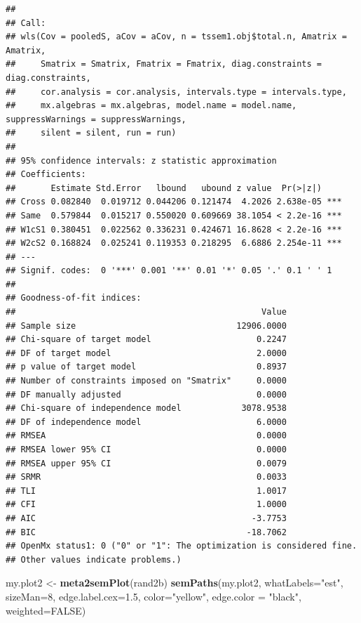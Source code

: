 \documentclass[]{article}
\newenvironment{Shaded}{\begin{snugshade}}{\end{snugshade}}
\newcommand{\KeywordTok}[1]{\textcolor[rgb]{0.13,0.29,0.53}{\textbf{#1}}}
\newcommand{\DataTypeTok}[1]{\textcolor[rgb]{0.13,0.29,0.53}{#1}}
\newcommand{\DecValTok}[1]{\textcolor[rgb]{0.00,0.00,0.81}{#1}}
\newcommand{\FloatTok}[1]{\textcolor[rgb]{0.00,0.00,0.81}{#1}}
\newcommand{\StringTok}[1]{\textcolor[rgb]{0.31,0.60,0.02}{#1}}
\newcommand{\OtherTok}[1]{\textcolor[rgb]{0.56,0.35,0.01}{#1}}
\newcommand{\NormalTok}[1]{#1}
\begin{document}
\begin{verbatim}
## 
## Call:
## wls(Cov = pooledS, aCov = aCov, n = tssem1.obj$total.n, Amatrix = Amatrix, 
##     Smatrix = Smatrix, Fmatrix = Fmatrix, diag.constraints = diag.constraints, 
##     cor.analysis = cor.analysis, intervals.type = intervals.type, 
##     mx.algebras = mx.algebras, model.name = model.name, suppressWarnings = suppressWarnings, 
##     silent = silent, run = run)
## 
## 95% confidence intervals: z statistic approximation
## Coefficients:
##       Estimate Std.Error   lbound   ubound z value  Pr(>|z|)    
## Cross 0.082840  0.019712 0.044206 0.121474  4.2026 2.638e-05 ***
## Same  0.579844  0.015217 0.550020 0.609669 38.1054 < 2.2e-16 ***
## W1cS1 0.380451  0.022562 0.336231 0.424671 16.8628 < 2.2e-16 ***
## W2cS2 0.168824  0.025241 0.119353 0.218295  6.6886 2.254e-11 ***
## ---
## Signif. codes:  0 '***' 0.001 '**' 0.01 '*' 0.05 '.' 0.1 ' ' 1
## 
## Goodness-of-fit indices:
##                                                 Value
## Sample size                                12906.0000
## Chi-square of target model                     0.2247
## DF of target model                             2.0000
## p value of target model                        0.8937
## Number of constraints imposed on "Smatrix"     0.0000
## DF manually adjusted                           0.0000
## Chi-square of independence model            3078.9538
## DF of independence model                       6.0000
## RMSEA                                          0.0000
## RMSEA lower 95% CI                             0.0000
## RMSEA upper 95% CI                             0.0079
## SRMR                                           0.0033
## TLI                                            1.0017
## CFI                                            1.0000
## AIC                                           -3.7753
## BIC                                          -18.7062
## OpenMx status1: 0 ("0" or "1": The optimization is considered fine.
## Other values indicate problems.)
\end{verbatim}

\begin{Shaded}
\begin{Highlighting}[]
\NormalTok{my.plot2 <-}\StringTok{ }\KeywordTok{meta2semPlot}\NormalTok{(rand2b)}
\KeywordTok{semPaths}\NormalTok{(my.plot2, }\DataTypeTok{whatLabels=}\StringTok{"est"}\NormalTok{, }\DataTypeTok{sizeMan=}\DecValTok{8}\NormalTok{, }\DataTypeTok{edge.label.cex=}\FloatTok{1.5}\NormalTok{, }
         \DataTypeTok{color=}\StringTok{"yellow"}\NormalTok{, }\DataTypeTok{edge.color =} \StringTok{"black"}\NormalTok{, }\DataTypeTok{weighted=}\OtherTok{FALSE}\NormalTok{)}
\end{Highlighting}
\end{Shaded}
\end{document}
